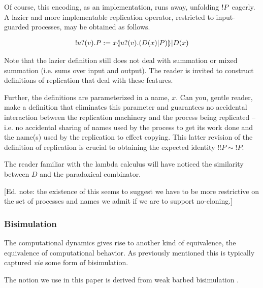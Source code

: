 \documentclass[12pt]{llncs}
\begin{document}
Of course, this encoding, as an implementation, runs away, unfolding
$! P$ eagerly. A lazier and more implementable replication
operator, restricted to input-guarded processes, may be obtained as follows.

\begin{eqnarray}
! u?(v) . P 
	:= 
	x \langle\!| u?(v) . (D(x) | P) |\!\rangle | D(x) \nonumber
\end{eqnarray}

\begin{remark}
  Note that the lazier definition still does not deal with summation
  or mixed summation (i.e. sums over input and output). The reader is
  invited to construct definitions of replication that deal with these
  features. 

  Further, the definitions are parameterized in a name, $x$. Can you,
  gentle reader, make a definition that eliminates this parameter and
  guarantees no accidental interaction between the replication
  machinery and the process being replicated -- i.e. no accidental
  sharing of names used by the process to get its work done and the
  name(s) used by the replication to effect copying. This latter
  revision of the definition of replication is crucial to obtaining
  the expected identity $!!P \sim !P$.
\end{remark}

\begin{remark}\label{rem:paradoxical_combinator}
  The reader familiar with the lambda calculus will have noticed the
  similarity between $D$ and the paradoxical combinator.

  [Ed. note: the existence of this seems to suggest we have to be more
  restrictive on the set of processes and names we admit if we are to
  support no-cloning.]
\end{remark}

\subsubsection{Bisimulation}

The computational dynamics gives rise to another kind of equivalence,
the equivalence of computational behavior. As previously mentioned
this is typically captured \emph{via} some form of bisimulation.


The notion we use in this paper is derived from weak barbed
bisimulation \cite{milner91polyadicpi}. 
\end{document}
